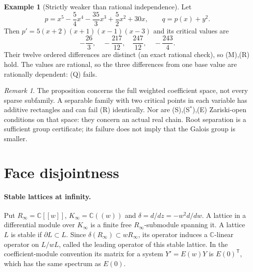 \documentclass[11pt]{article}
\numberwithin{equation}{section}
\theoremstyle{definition}
\newtheorem{example}[example]{Example}
\theoremstyle{remark}
\newtheorem{remark}[remark]{Remark}
\newcommand{\C}{\mathbb C}
\begin{document}
\begin{example}[Strictly weaker than rational independence]\label{ex:R-not-Q}
Let
\[
 p=x^5-\frac54x^4-\frac{35}{3}x^3+\frac52x^2+30x,
 \qquad q=p(x)+y^2.
\]
Then $p'=5(x+2)(x+1)(x-1)(x-3)$ and its critical values are
\[
 -\frac{26}{3},\quad -\frac{217}{12},\quad
 \frac{247}{12},\quad -\frac{243}{4}.
\]
Their twelve ordered differences are distinct (an exact rational check),
so (M),(R) hold. The values are rational, so the three differences from
one base value are rationally dependent: (Q) fails.
\end{example}

\begin{remark}
The proposition concerns the full weighted coefficient space, not every
sparse subfamily. A separable family with two critical points in each
variable has additive rectangles and can fail (R) identically. Nor are
(S),(S$^*$),(E) Zariski-open conditions on that space: they concern an
actual real chain. Root separation is a sufficient group certificate;
its failure does not imply that the Galois group is smaller.
\end{remark}

\section{Face disjointness}

\paragraph{Stable lattices at infinity.}
Put $R_\infty=\C[[w]]$, $K_\infty=\C((w))$ and
$\delta=d/dz=-w^2d/dw$. A lattice in a differential module over $K_\infty$
is a finite free $R_\infty$-submodule spanning it. A lattice $L$ is stable if
$\partial L\subset L$. Since $\delta(R_\infty)\subset wR_\infty$, its
operator induces a $\C$-linear operator on $L/wL$, called the leading
operator of this stable lattice. In the coefficient-module convention its
matrix for a system $Y'=E(w)Y$ is $E(0)^{\mathsf T}$, which has the same
spectrum as $E(0)$.
\end{document}
